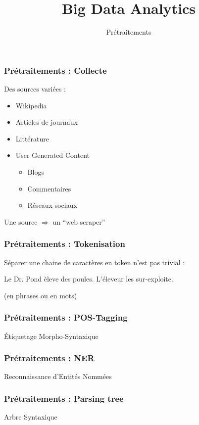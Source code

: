 \documentclass{formation}
\title{Big Data Analytics}
\subtitle{Prétraitements}
\begin{document}
\maketitle

\begin{frame}
  \frametitle{Prétraitements : Collecte}
  Des sources variées :
  \begin{itemize}
  \item Wikipedia
  \item Articles de journaux
  \item Littérature
  \item User Generated Content
    \begin{itemize}
    \item Blogs
    \item Commentaires
    \item Réseaux sociaux
    \end{itemize}
  \end{itemize}
  Une source $\Rightarrow$ un ``web scraper''
\end{frame}

\begin{frame}
  \frametitle{Prétraitements : Tokenisation}
  Séparer une chaine de caractères en token n'est pas trivial : \\
  \newline
  \begin{center}
    Le Dr. Pond èleve des poules. L'éleveur les sur-exploite.
  \end{center}
  $\;$ \\
  (en phrases ou en mots)
\end{frame}

\begin{frame}
  \frametitle{Prétraitements : POS-Tagging}
  Étiquetage Morpho-Syntaxique
\end{frame}

\begin{frame}
  \frametitle{Prétraitements : NER}
  Reconnaissance d'Entités Nommées
\end{frame}

\begin{frame}
  \frametitle{Prétraitements : Parsing tree}
  Arbre Syntaxique
\end{frame}
\end{document}
